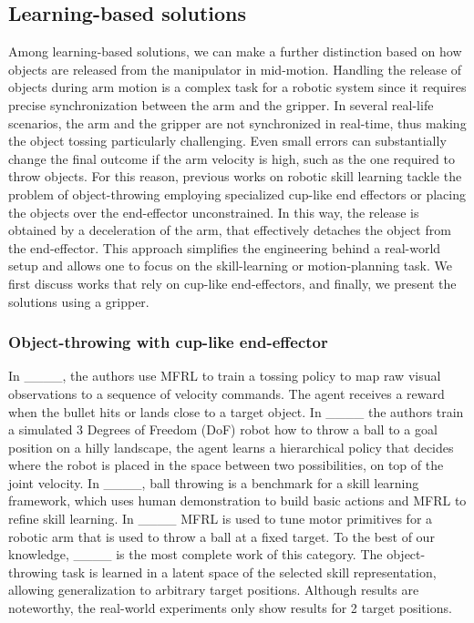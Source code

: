 \subsection{Learning-based solutions}
Among learning-based solutions, we can make a further distinction based on how objects are released from the manipulator in mid-motion.
Handling the release of objects during arm motion is a complex task for a robotic system since it requires precise synchronization between the arm and the gripper. In several real-life scenarios, the arm and the gripper are not synchronized in real-time, thus making the object tossing particularly challenging. Even small errors can substantially change the final outcome if the arm velocity is high, such as the one required to throw objects. 
For this reason, previous works on robotic skill learning tackle the problem of object-throwing employing specialized cup-like end effectors or placing the objects over the end-effector unconstrained. In this way, the release is obtained by a deceleration of the arm, that effectively detaches the object from the end-effector. This approach simplifies the engineering behind a real-world setup and allows one to focus on the skill-learning or motion-planning task. We first discuss works that rely on cup-like end-effectors, and finally, we present the solutions using a gripper.

\subsubsection{Object-throwing with cup-like end-effector}

In ____, the authors use MFRL to train a tossing policy to map raw visual observations to a sequence of velocity commands. The agent receives a reward when the bullet hits or lands close to a target object.
In ____ the authors train a simulated 3 Degrees of Freedom (DoF) robot how to throw a ball to a goal position on a hilly landscape, the agent learns a hierarchical policy that decides where the robot is placed in the space between two possibilities, on top of the joint velocity.
In ____, ball throwing is a benchmark for a skill learning framework, which uses human demonstration to build basic actions and MFRL to refine skill learning.
In ____ MFRL is used to tune motor primitives for a robotic arm that is used to throw a ball at a fixed target.
To the best of our knowledge, ____ is the most complete work of this category. The object-throwing task is learned in a latent space of the selected skill representation, allowing generalization to arbitrary target positions. Although results are noteworthy, the real-world experiments only show results for 2 target positions.

